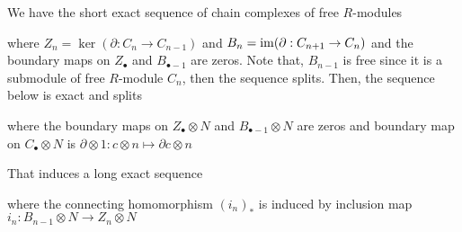 \begin{longproof}
	We have the short exact sequence of chain complexes of free $R$-modules
	\begin{center}
	\end{center}
	
	where $Z_n = \ker(\partial: C_n \to C_{n-1})$ and $B_n = \operatorname{im} (\partial: C_{n+1} \to C_n)$ and the boundary maps on $Z_\bullet$ and $B_{\bullet-1}$ are zeros. Note that, $B_{n-1}$ is free since it is a submodule of free $R$-module $C_n$, then the sequence splits. Then, the sequence below is exact and splits
	
	\begin{center}
	\end{center}
	
	where the boundary maps on $Z_\bullet \otimes N$ and $B_{\bullet-1} \otimes N$ are zeros and boundary map on $C_\bullet \otimes N$ is $\partial \otimes 1: c \otimes n \mapsto \partial c \otimes n$
	
	That induces a long exact sequence
	
	\begin{center}
	\end{center}
	
	where the connecting homomorphism $(i_n)_*$ is induced by inclusion map $i_n: B_{n-1} \otimes N \to Z_n \otimes N$
	
	\begin{center}
	\end{center}
	

\end{longproof}
